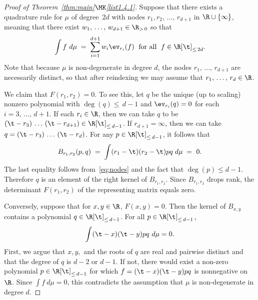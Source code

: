 \begin{proof}[Proof of Theorem~\ref{thm:main}$\MK$\eqref{list1.4.1}]
Suppose that there exists a quadrature rule for $\mu$ of degree~$2d$ with nodes $r_1, r_2,\,\hdots,\,r_{d+1}$ in $\R\cup\{\infty\}$, meaning that there exist $w_1,\,\hdots,\, w_{d+1}\in \R_{>\,0}$ so that
\begin{equation}\label{eq:nodes}
\int f \ d\mu \; = \; \sum_{i=1}^{d+1} w_i \ev_{r_i}(f) \; \text{ for all } \; f\in \R[\t]_{\leq\,2d}.
\end{equation}
Note that because $\mu$ is non-degenerate in degree $d$, the nodes $r_1,\,\hdots,\,r_{d+1}$ are necessarily distinct, so that after reindexing we may assume that $r_1,\,\hdots,\, r_d\in \R$.

We claim that $F(r_1, r_2) = 0$. To see this, let $q$ be the unique (up to scaling) nonzero polynomial with $\deg(q)\leq\,d-1$ and $\ev_{r_i}(q)=0$ for each $i=3,\,\hdots,\, d+1$. If each $r_i\in \R$, then we can take $ q$ to be $(\t-r_3)\,\hdots\,(\t-r_{d+1})\in \R[\t]_{\leq\,d-1}$. If $r_{d+1}=\infty$, then we can take $ q= (\t-r_3)\,\hdots\,(\t-r_{d})$. For any $p\in \R[\t]_{\leq\,d-1}$, it follows that
\[
B_{r_1,r_2}(p,q) \; = \; \int (r_1-\t)(r_2-\t) p q \; d\mu \; =\ 0.
\]
The last equality follows from~\eqref{eq:nodes} and the fact that $\deg(p)\leq d-1$. Therefore $q$ is an element of the right kernel of $B_{r_1, r_2}$. Since $B_{r_1, r_2}$ drops rank, the determinant $F(r_1, r_2)$ of the representing matrix equals zero.

Conversely, suppose that for $x,y\in \R$, $F(x,y)=0$. Then the kernel of $B_{x,y}$ contains a polynomial $q\in \R[\t]_{\leq\, d-1}$. For all $p\in \R[\t]_{\leq\,d-1}$,
\[
\int (\t-x)(\t-y)p q\ d\mu = 0.
\]
First, we argue that $x, y,$ and the roots of $q$ are real and pairwise distinct and that the degree of $q$ is $d-2$ or $d-1$. If not, there would exist a non-zero polynomial $p\in \R[\t]_{\leq\,d-1}$ for which $f=(\t-x)(\t-y)p q$ is nonnegative on $\R$. Since $\int f \ d\mu =0$, this contradicts the assumption that $\mu$ is non-degenerate in degree $d$.


\end{proof}
